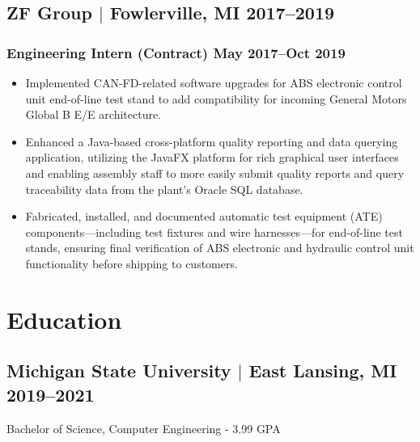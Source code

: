\documentclass[11pt]{article}
\begin{document}
\subsection{ZF Group $|$ {\normalfont Fowlerville, MI} \hfill 2017--2019}

\subsubsection{Engineering Intern (Contract) \hfill May 2017--Oct 2019}
\begin{itemize}
  \item Implemented CAN-FD-related software upgrades for ABS electronic control 
  unit end-of-line test stand to add compatibility for incoming General Motors 
  Global B E/E architecture.
  \item Enhanced a Java-based cross-platform quality reporting and data 
  querying application, utilizing the JavaFX platform for rich graphical user 
  interfaces and enabling assembly staff to more easily submit quality reports 
  and query traceability data from the plant's Oracle SQL database.
  \item Fabricated, installed, and documented automatic test equipment (ATE) 
  components—including test fixtures and wire harnesses—for end-of-line test 
  stands, ensuring final verification of ABS electronic and hydraulic control 
  unit functionality before shipping to customers.
\end{itemize}

\section{Education}
\subsection{Michigan State University $|$ {\normalfont East Lansing, MI} \hfill 2019--2021}
\noindent Bachelor of Science, Computer Engineering - 3.99 GPA
\end{document}
